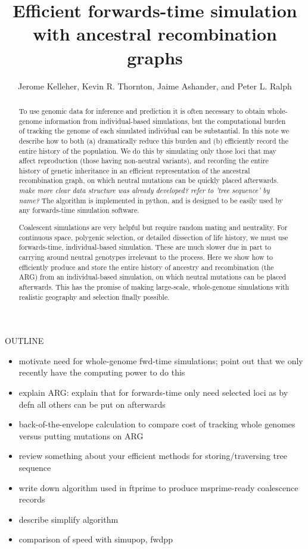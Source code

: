 \documentclass{article}
\newcommand{\plr}[1]{{\em \color{blue} #1}}
\begin{document}
\title{Efficient forwards-time simulation with ancestral recombination graphs}
\author{Jerome Kelleher, 
        Kevin R. Thornton,
        Jaime Ashander, and
        Peter L. Ralph}
\maketitle


\begin{abstract}
    To use genomic data for inference and prediction it is often necessary to obtain whole-genome information
    from individual-based simulations,
    but the computational burden of tracking the genome of each simulated individual can be substantial.
    In this note we describe how to both (a) dramatically reduce this burden and 
    (b) efficiently record the entire history of the population.
    We do this by simulating only those loci that may affect reproduction (those having non-neutral variants),
    and recording the entire history of genetic inheritance in an efficient representation of the ancestral recombination graph,
    on which neutral mutations can be quickly placed afterwards.
    \plr{make more clear data structure was already developed? refer to 'tree sequence' by name?}
    The algorithm is implemented in python,
    and is designed to be easily used by any forwards-time simulation software.

    Coalescent simulations are very helpful but require random mating and neutrality.
    For continuous space, polygenic selection, or detailed dissection of life history, 
    we must use forwards-time, individual-based simulation.
    These are much slower due in part to carrying around neutral genotypes irrelevant to the process.
    Here we show how to efficiently produce and store the entire history of ancestry and recombination
    (the ARG) from an individual-based simulation,
    on which neutral mutations can be placed afterwards.
    This has the promise of making large-scale, whole-genome simulations with realistic geography and selection finally possible.
\end{abstract}


OUTLINE
\begin{itemize}
    \item motivate need for whole-genome fwd-time simulations; point out that we only recently have the computing power to do this
    \item explain ARG: explain that for forwards-time only need selected loci as by defn all others can be put on afterwards
    \item back-of-the-envelope calculation to compare cost of tracking whole genomes versus putting mutations on ARG
    \item review something about your efficient methods for storing/traversing tree sequence
    \item write down algorithm used in ftprime to produce msprime-ready coalescence records
    \item describe simplify algorithm
    \item comparison of speed with simupop, fwdpp
\end{itemize}
\end{document}

